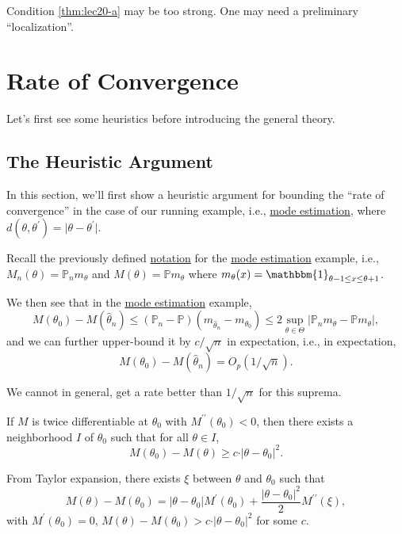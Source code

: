 \begin{remark}
	Condition \autoref{thm:lec20-a} may be too strong. One may need a preliminary ``localization''.
\end{remark}

\section{Rate of Convergence}
Let's first see some heuristics before introducing the general theory.

\subsection{The Heuristic Argument}
In this section, we'll first show a heuristic argument for bounding the ``rate of convergence'' in the case of our running example, i.e., \hyperref[eg:mode-estimation]{mode estimation}, where \(d(\theta , \theta ^{\prime} ) = \vert \theta - \theta ^{\prime} \vert \).

\begin{prev}
	Recall the previously defined \hyperref[not:M-estimation]{notation} for the \hyperref[eg:mode-estimation]{mode estimation} example, i.e., \(M_n(\theta ) = \mathbb{P} _n m_\theta \) and \(M(\theta ) = \mathbb{P} m_\theta \) where \(m_\theta (x) = \mathbbm{1}_{\theta -1 \leq x \leq \theta +1} \).
\end{prev}

We then see that in the \hyperref[eg:mode-estimation]{mode estimation} example,
\[
	M(\theta _0) - M(\hat{\theta} _n)
	\leq (\mathbb{P} _n - \mathbb{P} ) (m_{\hat{\theta } _n } - m_{\theta _0})
	\leq 2 \sup _{\theta \in \Theta } \vert \mathbb{P} _n m_\theta - \mathbb{P} m_\theta \vert,
\]
and we can further upper-bound it by \(c / \sqrt{n} \) in expectation, i.e., in expectation,
\[
	M(\theta _0) - M(\hat{\theta } _n ) = O_p(1 / \sqrt{n} ).
\]

\begin{note}
	We cannot in general, get a rate better than \(1 / \sqrt{n} \) for this suprema.
\end{note}

\begin{remark}
	If \(M\) is twice differentiable at \(\theta _0\) with \(M^{\prime\prime} (\theta _0) < 0\), then there exists a neighborhood \(I\) of \(\theta _0\) such that for all \(\theta \in I\),
	\[
		M(\theta _0) - M(\theta ) \geq c \cdot \vert \theta - \theta _0 \vert ^2.
	\]
\end{remark}
\begin{explanation}
	From Taylor expansion, there exists \(\xi \) between \(\theta \) and \(\theta _0\) such that
	\[
		M(\theta ) - M(\theta _0)
		=  \vert \theta - \theta _0 \vert M^{\prime} (\theta _0) + \frac{ \vert \theta - \theta _0 \vert ^2}{2} M^{\prime\prime} (\xi ),
	\]
	with \(M^{\prime} (\theta _0) = 0\), \(M(\theta ) - M(\theta _0) > c \cdot \vert \theta - \theta _0 \vert ^2\) for some \(c\).
\end{explanation}


